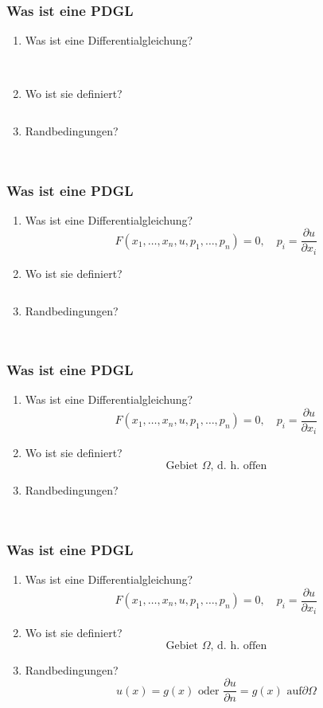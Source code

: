 \documentclass{beamer}
\begin{document}
\begin{frame}
\frametitle{Was ist eine PDGL}
\begin{enumerate}
\item Was ist eine Differentialgleichung?
\[
\phantom{
F( x_1,\dots,x_n,u,p_1, \dots,p_n) =0,\quad p_i=\frac{\partial u}{\partial x_i}
}
\]
\item Wo ist sie definiert?
\[
\phantom{
\text{Gebiet $\Omega$, d.~h.~offen}
}
\]
\item Randbedingungen?
\[
\phantom{
\text{$u(x)=g(x)$ oder $\frac{\partial u}{\partial n}=g(x)$ auf
$\partial\Omega$}
}
\]
\end{enumerate}
\end{frame}

\begin{frame}
\frametitle{Was ist eine PDGL}
\begin{enumerate}
\item Was ist eine Differentialgleichung?
\[
F( x_1,\dots,x_n,u,p_1, \dots,p_n) =0,\quad p_i=\frac{\partial u}{\partial x_i}
\]
\item Wo ist sie definiert?
\[
\phantom{
\text{Gebiet $\Omega$, d.~h.~offen}
}
\]
\item Randbedingungen?
\[
\phantom{
\text{$u(x)=g(x)$ oder $\frac{\partial u}{\partial n}=g(x)$ auf
$\partial\Omega$}
}
\]
\end{enumerate}
\end{frame}

\begin{frame}
\frametitle{Was ist eine PDGL}
\begin{enumerate}
\item Was ist eine Differentialgleichung?
\[
F( x_1,\dots,x_n,u,p_1, \dots,p_n) =0,\quad p_i=\frac{\partial u}{\partial x_i}
\]
\item Wo ist sie definiert?
\[
\text{Gebiet $\Omega$, d.~h.~offen}
\]
\item Randbedingungen?
\[
\phantom{
\text{$u(x)=g(x)$ oder $\frac{\partial u}{\partial n}=g(x)$ auf
$\partial\Omega$}
}
\]
\end{enumerate}
\end{frame}

\begin{frame}
\frametitle{Was ist eine PDGL}
\begin{enumerate}
\item Was ist eine Differentialgleichung?
\[
F( x_1,\dots,x_n,u,p_1, \dots,p_n) =0,\quad p_i=\frac{\partial u}{\partial x_i}
\]
\item Wo ist sie definiert?
\[
\text{Gebiet $\Omega$, d.~h.~offen}
\]
\item Randbedingungen?
\[
\text{$u(x)=g(x)$ oder $\frac{\partial u}{\partial n}=g(x)$ auf
$\partial\Omega$}
\]
\end{enumerate}
\end{frame}
\end{document}
